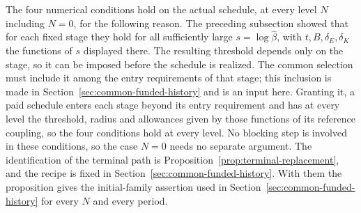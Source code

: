 The four numerical conditions hold on the actual schedule, at every
level $N$ including $N=0$, for the following reason. The preceding
subsection showed that for each fixed stage they hold for all
sufficiently large $s=\log\widehat\beta$, with $t,B,\delta_E,\delta_K$
the functions of $s$ displayed there. The resulting threshold depends
only on the stage, so it can be imposed before the schedule is
realized. The common selection must include it among the entry
requirements of that stage; this inclusion is made in
Section~\ref{sec:common-funded-history} and is an input here. Granting
it, a paid schedule enters each stage beyond its entry requirement
and has at every level the threshold, radius and allowances given by
those functions of its reference coupling, so the four conditions
hold at every level. No blocking step is involved in these
conditions, so the case $N=0$ needs no separate argument. The identification of
the terminal path is Proposition~\ref{prop:terminal-replacement}, and
the recipe is fixed in Section~\ref{sec:common-funded-history}. With
them the proposition gives the initial-family assertion used in
Section~\ref{sec:common-funded-history} for every $N$ and every
period.
